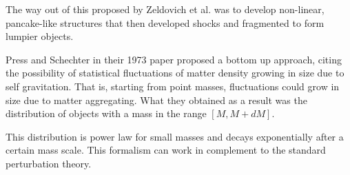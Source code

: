 \documentclass[12pt,a4paper,oneside]{book}
\begin{document}
		The way out of this proposed by Zeldovich et al. was to develop non-linear, pancake-like structures that then developed shocks and fragmented to form lumpier objects.
		
		Press and Schechter in their 1973 paper proposed a bottom up approach, citing the possibility of statistical fluctuations of matter density growing in size due to self gravitation. That is, starting from point masses, fluctuations could grow in size due to matter aggregating. What they obtained as a result was the distribution of objects with a mass in the range $[M, M+dM]$. 
		
		This distribution is power law for small masses and decays exponentially after a certain mass scale. This formalism can work in complement to the standard perturbation theory.
\end{document}
